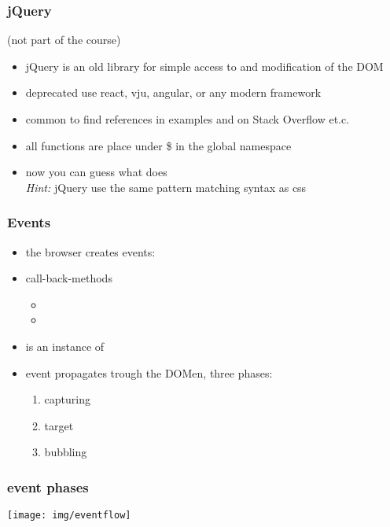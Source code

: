 \begin{frame}[fragile]
\frametitle{jQuery}
\color{structure}
(not part of the course)\\
\begin{itemize}\color{structure}
\item jQuery is an old library for simple access to and modification of the DOM
\item deprecated use react, vju, angular, or any modern framework
\item common to find references in examples and on Stack Overflow et.c.
\item all functions are place under \$ in the global namespace
\item now you can guess what  does\\ \emph{Hint:} jQuery use the same pattern matching syntax as css
\end{itemize}
\end{frame}

\begin{frame}[fragile]
\frametitle{Events}
\color{structure}

\begin{itemize}\color{structure}
\item the browser creates events: 
\item call-back-methods
\begin{itemize}
  \item {}
  \item {}
\end{itemize}
\item {} is an instance of 
\item event propagates trough the DOMen, three phases:
  \begin{enumerate}
    \item capturing
    \item target
    \item bubbling
  \end{enumerate}
\end{itemize}

\end{frame}

\begin{frame}[fragile]
\frametitle{event phases}
\color{structure}
  \centering
  \texttt{[image: img/eventflow]}

\end{frame}

